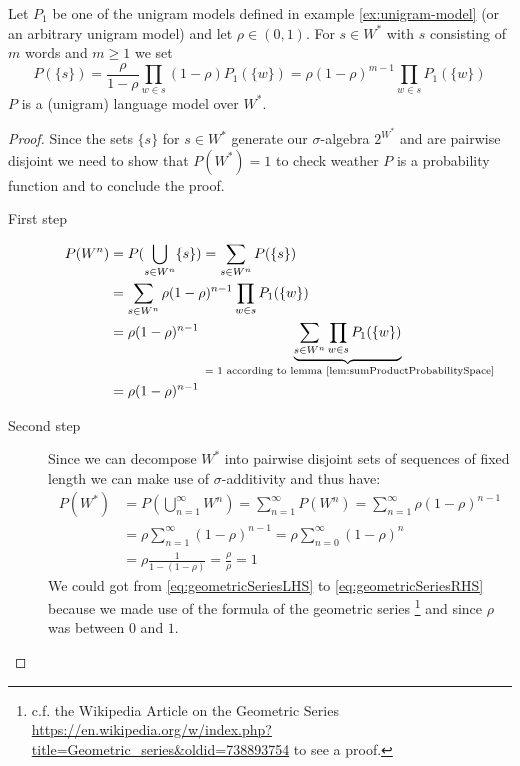\documentclass[•]{book}
\begin{document}
\begin{theorem}\label{thm:unigram-lm}
Let $P_1$ be one of the unigram models defined in example \ref{ex:unigram-model} (or an arbitrary unigram model) and let $\rho \in (0,1)$.
For $s\in W^{*}$ with $s$ consisting of $m$ words and $m\geq 1$ we set
\begin{equation}
P(\{s\}) = \frac{\rho}{1-\rho}\prod_{w\in s}(1-\rho)P_1(\{w\}) =  \rho(1-\rho)^{m-1}\prod_{w\in s}P_1(\{w\})
\end{equation}
$P$ is a (unigram) language model over $W^{*}$.
\begin{proof}
Since the sets $\{s\}$ for $s\in W^{*}$ generate our $\sigma$-algebra $2^{W^{*}}$ and are pairwise disjoint we need to show that $P(W^{*})=1$ to check weather $P$ is a probability function and to conclude the proof.

\begin{description}
\item[First step] 
\begin{align}
P(W^n) & = P(\bigcup_{s\in W^n} \{s\}) = \sum_{s\in W^n}P(\{s\}) \\
 & = \sum_{s\in W^n}\rho(1-\rho)^{n-1}\prod_{w\in s}P_1(\{w\}) \\
 & = \rho(1-\rho)^{n-1} \underbrace{\sum_{s\in W^n}\prod_{w\in s}P_1(\{w\})}_{\text{ = 1 according to lemma \ref{lem:sumProductProbabilitySpace}}} \\
 & = \rho(1-\rho)^{n-1}
\end{align}

\item[Second step] Since we can decompose $W^{*}$ into pairwise disjoint sets of sequences of fixed length we can make use of $\sigma$-additivity and thus have: 
\begin{align}
P(W^{*}) & = P(\bigcup_{n=1}^\infty W^n) = \sum_{n=1}^\infty P(W^n) = \sum_{n=1}^\infty \rho(1-\rho)^{n-1} \\
 & =  \rho \sum_{n=1}^\infty(1-\rho)^{n-1} = \rho \sum_{n=0}^\infty(1-\rho)^{n} \label{eq:geometricSeriesLHS} \\
 &  = \rho \frac{1}{1-(1-\rho)} = \frac{\rho}{\rho} = 1 \label{eq:geometricSeriesRHS}
\end{align}
We could got from \ref{eq:geometricSeriesLHS} to \ref{eq:geometricSeriesRHS} because we made use of the formula of the geometric series \footnote{c.f. the Wikipedia Article on the Geometric Series \url{https://en.wikipedia.org/w/index.php?title=Geometric_series&oldid=738893754} to see a proof. } and since $\rho$ was between $0$ and $1$.
\end{description} 
\end{proof}
\end{theorem}
\end{document}
